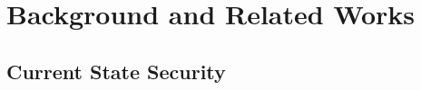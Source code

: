 \chapter{Background and Related Works}
\label{ch:background_related}


\section{Current State Security}
\label{sec:ch2_current_state}




